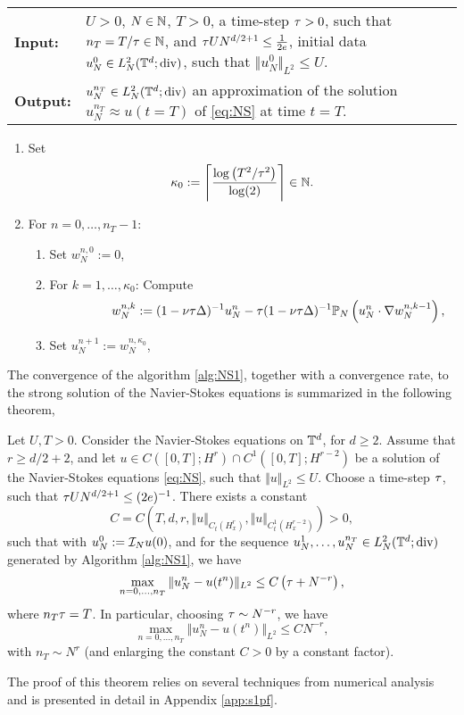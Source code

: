 \documentclass[reqno,a4paper]{amsart}
\begin{document}
\begin{algorithm} 
\label{alg:NS1}
\phantom{a} \\
\noindent
\begin{tabular}{lp{}}
\textbf{Input:} & 
$U>0$, $N\in \mathbb{N}$, $T>0$, a time-step ${\tau}>0$, such that $n_T = T/{\tau} \in \mathbb{N}$, and ${\tau} U N^{d/2+1} \le \frac1{2e}$, initial data $u_N^0 \in L^2_N(\mathbb{T}^d;{\mathrm{div}})$, such that $\Vert u_N^0 \Vert_{L^2} \le U$.
\\
\textbf{Output:} & 
$u_N^{n_T} \in L^2_N(\mathbb{T}^d;{\mathrm{div}})$ an approximation of the solution $u_N^{n_T} \approx u(t=T)$ of \eqref{eq:NS} at time $t=T$.
\end{tabular}
\begin{enumerate}
\item Set 
\[
\kappa_0 := 
\left\lceil
\frac{\log\left(T^2 /{\tau}^2\right)}{\log(2)}
\right\rceil
\in \mathbb{N}.
\]
\item For $n=0,\dots, n_T-1$:
\begin{enumerate}
\item Set $w^{n,0}_N := 0$,
\item For $k=1,\dots, \kappa_0$: Compute
\[
\hspace{40pt}
w^{n,k}_N := (1-\nu {\tau} \Delta)^{-1} u^n_N - {\tau} (1-\nu{\tau} \Delta)^{-1} \mathbb{P}_N \left( u^n_N \cdot \nabla w^{n,k-1}_N \right),
\]
\item Set $u^{n+1}_N := w^{n,\kappa_0}_N$,
\end{enumerate}
\end{enumerate}
\end{algorithm}
The convergence of the algorithm \ref{alg:NS1}, together with a convergence rate, to the strong solution of the Navier-Stokes equations is summarized in the following theorem,
\begin{theorem} \label{thm:scheme1}
Let $U,T>0$. Consider the Navier-Stokes equations on $\mathbb{T}^d$, for $d\ge 2$. Assume that $r\ge d/2 +2$, and let $u \in C([0,T]; H^r) \cap C^1([0,T];H^{r-2})$ be a solution of the Navier-Stokes equations \eqref{eq:NS}, such that $\Vert u \Vert_{L^2}\le U$. Choose a time-step ${\tau}$, such that ${\tau} U N^{d/2+1}\le (2e)^{-1}$. There exists a constant 
\[
C = C(T,d,r,\Vert u \Vert_{C_t(H^r_x)}, \Vert u \Vert_{C^1_t(H^{r-2}_x)}) > 0,
\]
such that with $u^0_N := \mathcal{I}_N u(0)$, and for the sequence $u^1_N, \dots, u^{n_T}_N \in L^2_N(\mathbb{T}^d;{\mathrm{div}})$ generated by Algorithm \ref{alg:NS1}, we have
\[
\max_{n=0,\dots, n_T}
\Vert u^n_N - u(t^n) \Vert_{L^2}
\le
C \left({\tau} + N^{-r}\right),
\]
where $n_T{\tau} = T$. In particular, choosing ${\tau} \sim N^{-r}$, we have
\[
\max_{n=0,\dots, n_T}
\Vert u^n_N - u(t^n) \Vert_{L^2}
\le
C N^{-r},
\]
with $n_T \sim N^r$ (and enlarging the constant $C>0$ by a constant factor).
\end{theorem}
The proof of this theorem relies on several techniques from numerical analysis and is presented in detail in Appendix \ref{app:s1pf}. 
\end{document}
